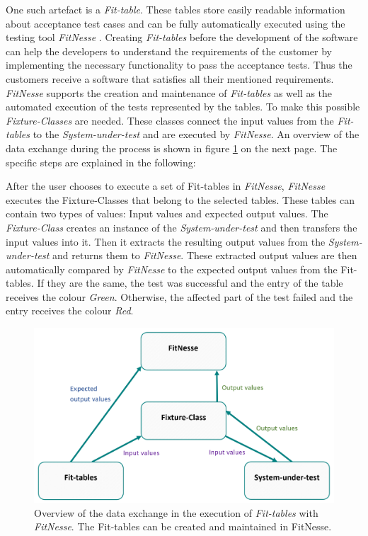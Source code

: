 One such artefact is a \textit{Fit-table}. 
These tables store easily readable information about acceptance test cases and can be fully automatically executed using the testing tool \textit{FitNesse} \cite{fitnesse}.
Creating \textit{Fit-tables} before the development of the software can help the developers to understand the requirements of the customer by implementing the necessary functionality to pass the acceptance tests.
Thus the customers receive a software that satisfies all their mentioned requirements.
\textit{FitNesse} supports the creation and maintenance of \textit{Fit-tables} as well as the automated execution of the tests represented by the tables.
To make this possible \textit{Fixture-Classes} are needed.
These classes connect the input values from the \textit{Fit-tables} to the \textit{System-under-test} and are executed by \textit{FitNesse}.
An overview of the data exchange during the process is shown in figure \ref{fig:overview-fitnesse} on the next page.
The specific steps are explained in the following:

After the user chooses to execute a set of Fit-tables in \textit{FitNesse}, \textit{FitNesse} executes the Fixture-Classes that belong to the selected tables.
These tables can contain two types of values: Input values and expected output values.
The \textit{Fixture-Class} creates an instance of the \textit{System-under-test} and then transfers the input values into it.
Then it extracts the resulting output values from the \textit{System-under-test} and returns them to \textit{FitNesse}.
These extracted output values are then automatically compared by \textit{FitNesse} to the expected output values from the Fit-tables.
If they are the same, the test was successful and the entry of the table receives the colour \textit{Green}.
Otherwise, the affected part of the test failed and the entry receives the colour \textit{Red}.

\begin{figure}[H]
	\centering
	\includegraphics[width=.75\textwidth]{../images/fitnesse-overview.png}
	\caption{Overview of the data exchange in the execution of \textit{Fit-tables} with \textit{FitNesse}. The Fit-tables can be created and maintained in FitNesse.}
	\label{fig:overview-fitnesse}
\end{figure}


